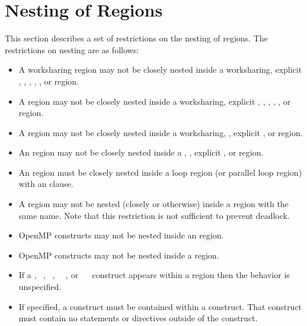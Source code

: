 \section{Nesting of Regions}
\label{sec:Nesting of Regions}
This section describes a set of restrictions on the nesting of regions. The restrictions on 
nesting are as follows:

\begin{itemize}
\item A worksharing region may not be closely nested inside a worksharing, explicit , ,
, , , or  region.

\item A  region may not be closely nested inside a worksharing, explicit , ,
, , , or  region.

\item A  region may not be closely nested inside a worksharing, ,  
explicit , or  region.

\item An  region may not be closely nested inside a , ,
explicit , or  region. 

\item An  region must be closely nested inside a loop region (or parallel loop 
region) with an  clause.

\item A  region may not be nested (closely or otherwise) inside a  
region with the same name. Note that this restriction is not sufficient to prevent 
deadlock.

\item OpenMP constructs may not be nested inside an  region.

\item OpenMP constructs may not be nested inside a  region.

\item If a , ~, ~,
~~, or ~~ construct appears
within a  region then the behavior is unspecified. 

\item If specified, a  construct must be contained within a  construct. That 
 construct must contain no statements or directives outside of the  
construct. 


\end{itemize}

